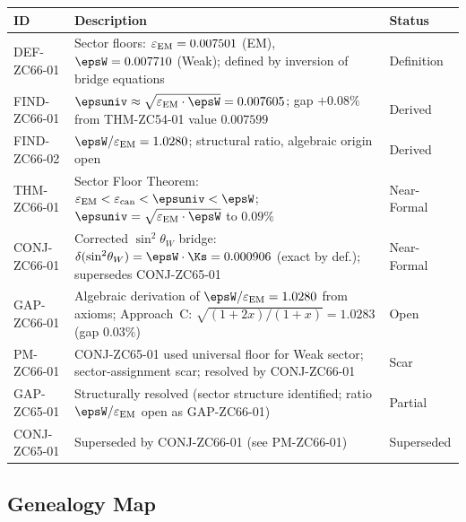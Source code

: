 \documentclass[12pt, a4paper]{article}
\renewcommand{\epsEM}{\varepsilon_{\rm EM}}
\renewcommand{\epscan}{\varepsilon_{\rm can}}
\renewcommand{\swsq}{\sin^2\!\theta_W}
\begin{document}
\bigskip
\begin{formalbox}[title={Atomic Registry --- ZC66}]
\begin{center}
\renewcommand{\arraystretch}{1.3}
\small
\begin{tabular}{lp{7.8cm}l}
\toprule
ID & Description & Status \\
\midrule
DEF-ZC66-01
  & Sector floors: $\epsEM = 0.007501$ (EM), $\epsW = 0.007710$ (Weak);
    defined by inversion of bridge equations
  & Definition \\
FIND-ZC66-01
  & $\epsuniv \approx \sqrt{\epsEM\cdot\epsW} = 0.007605$;
    gap $+0.08\%$ from THM-ZC54-01 value $0.007599$
  & Derived \\
FIND-ZC66-02
  & $\epsW/\epsEM = 1.0280$; structural ratio,
    algebraic origin open
  & Derived \\
THM-ZC66-01
  & Sector Floor Theorem:
    $\epsEM < \epscan < \epsuniv < \epsW$;
    $\epsuniv = \sqrt{\epsEM\cdot\epsW}$ to $0.09\%$
  & Near-Formal \\
CONJ-ZC66-01
  & Corrected $\swsq$ bridge:
    $\delta(\swsq) = \epsW\cdot\Ks = 0.000906$ (exact by def.);
    supersedes CONJ-ZC65-01
  & Near-Formal \\
GAP-ZC66-01
  & Algebraic derivation of $\epsW/\epsEM = 1.0280$ from axioms;
    Approach~C: $\sqrt{(1+2x)/(1+x)} = 1.0283$ (gap $0.03\%$)
  & Open \\
PM-ZC66-01
  & CONJ-ZC65-01 used universal floor for Weak sector;
    sector-assignment scar; resolved by CONJ-ZC66-01
  & Scar \\
\midrule
GAP-ZC65-01  & Structurally resolved (sector structure identified;
               ratio $\epsW/\epsEM$ open as GAP-ZC66-01)
             & Partial \\
CONJ-ZC65-01 & Superseded by CONJ-ZC66-01 (see PM-ZC66-01)
             & Superseded \\
\bottomrule
\end{tabular}
\end{center}
\end{formalbox}

\subsection{Genealogy Map}
\label{sec:genealogy}
\end{document}
